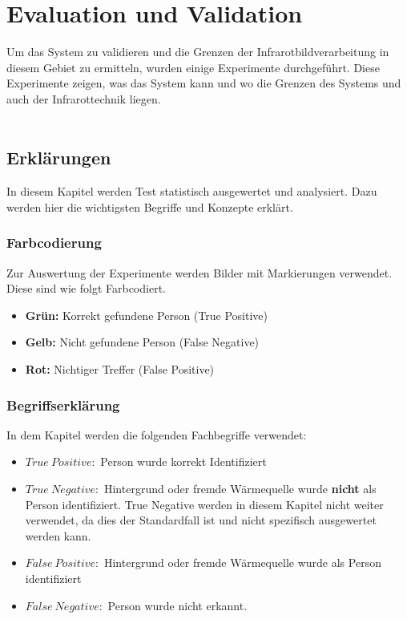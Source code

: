 \chapter{Evaluation und Validation}
\label{ch:Eval}

Um das System zu validieren und die Grenzen der Infrarotbildverarbeitung in diesem Gebiet zu ermitteln, wurden einige Experimente durchgeführt. Diese Experimente zeigen, was das System kann und wo die Grenzen des Systems und auch der Infrarottechnik liegen.\\
\\
\section{Erklärungen}
\label{sec:explanation}
In diesem Kapitel werden Test statistisch ausgewertet und analysiert. Dazu werden hier die wichtigsten Begriffe und Konzepte erklärt.

\subsection{Farbcodierung}
Zur Auswertung der Experimente werden Bilder mit Markierungen verwendet. Diese sind wie folgt Farbcodiert.\\

\begin{itemize}
	\item \textbf{Grün:} Korrekt gefundene Person (True Positive)
	\item \textbf{Gelb:} Nicht gefundene Person (False Negative)
	\item \textbf{Rot:} Nichtiger Treffer (False Positive)
\end{itemize}
\vspace{1em}

\subsection{Begriffserklärung}
\noindent In dem Kapitel werden die folgenden Fachbegriffe verwendet:
\begin{itemize}
	\item $True\: Positive:$   Person wurde korrekt Identifiziert
	\item $True\: Negative:$   Hintergrund oder fremde Wärmequelle wurde \textbf{nicht} als Person identifiziert. True Negative werden in diesem Kapitel nicht weiter verwendet, da dies der Standardfall ist und nicht spezifisch ausgewertet werden kann.
	\item $False\: Positive:$  Hintergrund oder fremde Wärmequelle wurde als Person identifiziert
	\item $False\: Negative:$  Person wurde nicht erkannt.
\end{itemize}
\vspace{1em}

